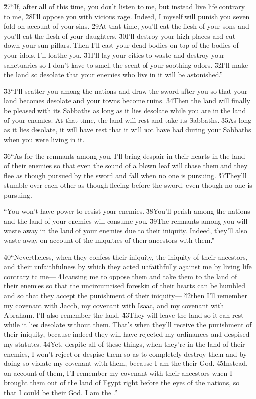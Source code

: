 \v{27}``If, after all of this time, you don't listen to me, but instead live life contrary to me, \v{28}I'll oppose you with vicious rage. Indeed, I myself will punish you seven fold on account of your sins. \v{29}At that time, you'll eat the flesh of your sons and you'll eat the flesh of your daughters. \v{30}I'll destroy your high places and cut down your sun pillars. Then I'll cast your dead bodies on top of the bodies of your idols. I'll loathe you. \v{31}I'll lay your cities to waste and destroy your sanctuaries so I don't have to smell the scent of your soothing odors. \v{32}I'll make the land so desolate that your enemies who live in it will be astonished.''

\v{33}``I'll scatter you among the nations and draw the sword after you so that your land becomes desolate and your towns become ruins. \v{34}Then the land will finally be pleased with its Sabbaths as long as it lies desolate while you are in the land of your enemies. At that time, the land will rest and take its Sabbaths. \v{35}As long as it lies desolate, it will have rest that it will not have had during your Sabbaths when you were living in it.

\v{36}``As for the remnants among you, I'll bring despair in their hearts in the land of their enemies so that even the sound of a blown leaf will chase them and they flee as though pursued by the sword and fall when no one is pursuing. \v{37}They'll stumble over each other as though fleeing before the sword, even though no one is pursuing.

``You won't have power to resist your enemies. \v{38}You'll perish among the nations and the land of your enemies will consume you. \v{39}The remnants among you will waste away in the land of your enemies due to their iniquity. Indeed, they'll also waste away on account of the iniquities of their ancestors with them.''

\v{40}``Nevertheless, when they confess their iniquity, the iniquity of their ancestors, and their unfaithfulness by which they acted unfaithfully against me by living life contrary to me--- \v{41}causing me to oppose them and take them to the land of their enemies so that the uncircumcised foreskin of their hearts can be humbled and so that they accept the punishment of their iniquity--- \v{42}then I'll remember my covenant with Jacob, my covenant with Isaac, and my covenant with Abraham. I'll also remember the land. \v{43}They will leave the land so it can rest while it lies desolate without them. That's when they'll receive the punishment of their iniquity, because indeed they will have rejected my ordinances and despised my statutes. \v{44}Yet, despite all of these things, when they're in the land of their enemies, I won't reject or despise them so as to completely destroy them and by doing so violate my covenant with them, because I am the  their God. \v{45}Instead, on account of them, I'll remember my covenant with their ancestors when I brought them out of the land of Egypt right before the eyes of the nations, so that I could be their God. I am the .''

